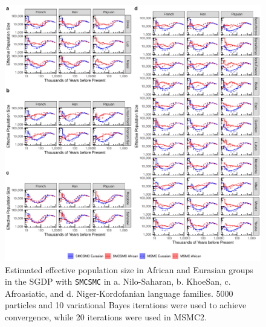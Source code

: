 \documentclass{article}
\begin{document}
\begin{figure}
	\centering
	\includegraphics[width=0.95\linewidth]{plot/sgdp_ne_new.pdf}
	\caption{Estimated effective population size in African and Eurasian groups in the SGDP with {\tt SMCSMC} in a. Nilo-Saharan, b. KhoeSan, c. Afroasiatic, and d. Niger-Kordofanian language families. 5000 particles and 10 variational Bayes iterations were used to achieve convergence, while 20 iterations were used in MSMC2.}	
	\label{sgdp_ne}
\end{figure}
\end{document}
